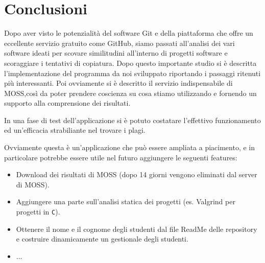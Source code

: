 \chapter{Conclusioni}
	Dopo aver visto le potenzialità del software Git e della piattaforma che offre un eccellente servizio gratuito come GitHub, siamo passati all'analisi dei vari software ideati per scovare similitudini all'interno di progetti software e scoraggiare i tentativi di copiatura.
	Dopo questo importante studio si è descritta l'implementazione del programma da noi sviluppato riportando i passaggi ritenuti più interessanti. Poi ovviamente si è descritto il servizio indispensabile di MOSS,così da poter prendere coscienza su cosa stiamo utilizzando e fornendo un supporto alla comprensione dei risultati.
	
	In una fase di test dell'applicazione si è potuto costatare l'effettivo funzionamento ed un'efficacia strabiliante nel trovare i plagi.
	
	Ovviamente questa è un'applicazione che può essere ampliata a piacimento, e in particolare potrebbe essere utile nel futuro aggiungere le seguenti features:
	\begin{itemize}
		\item Download dei risultati di MOSS (dopo 14 giorni vengono eliminati dal server di MOSS).
		\item Aggiungere una parte sull'analisi statica dei progetti (es. Valgrind per progetti in \verb|C|).
		\item Ottenere il nome e il cognome degli studenti dal file ReadMe delle repository e costruire dinamicamente un gestionale degli studenti.
		\item ...
	\end{itemize}
